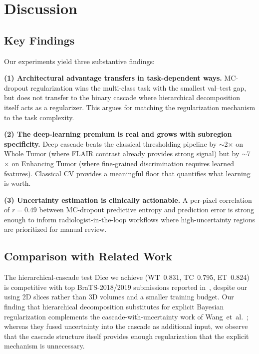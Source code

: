 \documentclass[conference]{IEEEtran}
\begin{document}
\section{Discussion}
\label{sec:discussion}

\subsection{Key Findings}

Our experiments yield three substantive findings:

\textbf{(1) Architectural advantage transfers in task-dependent ways.}
MC-dropout regularization wins the multi-class task with the smallest
val--test gap, but does not transfer to the binary cascade where
hierarchical decomposition itself acts as a regularizer. This argues
for matching the regularization mechanism to the task complexity.

\textbf{(2) The deep-learning premium is real and grows with subregion
specificity.} Deep cascade beats the classical thresholding pipeline by
$\sim$2$\times$ on Whole Tumor (where FLAIR contrast already provides
strong signal) but by $\sim$7$\times$ on Enhancing Tumor (where
fine-grained discrimination requires learned features). Classical CV
provides a meaningful floor that quantifies what learning is worth.

\textbf{(3) Uncertainty estimation is clinically actionable.} A
per-pixel correlation of $r = 0.49$ between MC-dropout predictive
entropy and prediction error is strong enough to inform
radiologist-in-the-loop workflows where high-uncertainty regions are
prioritized for manual review.

\subsection{Comparison with Related Work}

The hierarchical-cascade test Dice we achieve
(WT~0.831, TC~0.795, ET~0.824) is competitive with top BraTS-2018/2019
submissions reported in~\cite{bakas2018brats}, despite our using 2D
slices rather than 3D volumes and a smaller training budget. Our
finding that hierarchical decomposition substitutes for explicit
Bayesian regularization complements the cascade-with-uncertainty work
of Wang~et~al.~\cite{wang2019cascaded}; whereas they fused uncertainty
into the cascade as additional input, we observe that the cascade
structure itself provides enough regularization that the explicit
mechanism is unnecessary.
\end{document}
